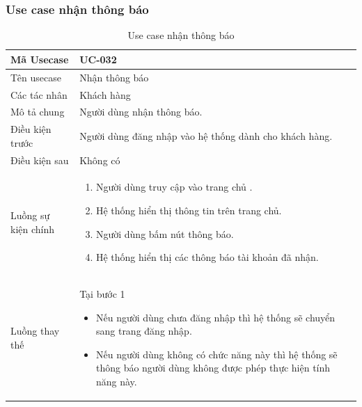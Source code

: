 \documentclass[12pt,a4paper]{article}
\begin{document}
    \subsubsection*{Use case nhận thông báo}
    \begin{table}[H]
        \centering
        \begin{tabular}{|p{3.5cm}|p{11.5cm}|c|}
            \hline
            Mã Usecase      & UC-032                                                 \\
            \hline
            Tên usecase     & Nhận thông báo                                         \\
            \hline
            Các tác nhân    & Khách hàng                                             \\
            \hline
            Mô tả chung     & Người dùng nhận thông báo.                             \\
            \hline

            Điều kiện trước & Người dùng đăng nhập vào hệ thống dành cho khách hàng. \\
            \hline

            Điều kiện sau   & Không có                                               \\
            \hline

            Luồng sự kiện chính & \vspace{-.8cm}\begin{enumerate}
                                                    \item Người dùng truy cập vào trang chủ .
                                                    \item Hệ thống hiển thị thông tin trên trang chủ.
                                                    \item Người dùng bấm nút thông báo.
                                                    \item Hệ thống hiển thị các thông báo tài khoản đã nhận.
            \end{enumerate}
            \\
            \hline
            Luồng thay thế & Tại bước 1\newline
            \vspace{-.8cm}\begin{itemize}
                              \item Nếu người dùng chưa đăng nhập thì hệ thống sẽ chuyển sang trang đăng nhập.
                              \item Nếu người dùng không có chức năng này thì hệ thống sẽ thông báo người dùng không được phép thực hiện tính năng này.
            \end{itemize}

            \\ \hline
        \end{tabular}
        \caption{Use case nhận thông báo}

    \end{table}
\end{document}
